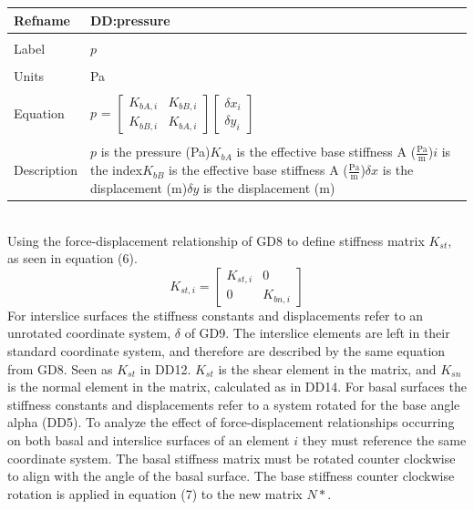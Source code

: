 \documentclass[12pt]{article}
\begin{document}
\noindent \begin{minipage}{\textwidth}
\begin{tabular}{p{} p{}}
\toprule \textbf{Refname} & \textbf{DD:pressure}
\label{DD:pressure}
\\ \midrule \\
Label & $p$
\\ \midrule \\
Units & Pa
\\ \midrule \\
Equation & $p$ = $\begin{bmatrix}
K_{bA,i} & K_{bB,i}\\
K_{bB,i} & K_{bA,i}
\end{bmatrix}\begin{bmatrix}
{\delta{}x}_{i}\\
{\delta{}y}_{i}
\end{bmatrix}$
\\ \midrule \\
Description & $p$ is the pressure (Pa)\newline$K_{bA}$ is the effective base stiffness A ($\frac{\text{Pa}}{\text{m}}$)\newline$i$ is the index\newline$K_{bB}$ is the effective base stiffness A ($\frac{\text{Pa}}{\text{m}}$)\newline$\delta{}x$ is the displacement (m)\newline$\delta{}y$ is the displacement (m)
\\ \bottomrule \end{tabular}
\end{minipage}\\
Using the force-displacement relationship of GD8 to define stiffness matrix $K_{st}$, as seen in equation (6).
\begin{equation}
K_{st,i}=\begin{bmatrix}
K_{st,i} & 0\\
0 & K_{bn,i}
\end{bmatrix}
\end{equation}
For interslice surfaces the stiffness constants and displacements refer to an unrotated coordinate system, $\delta{}$ of GD9. The interslice elements are left in their standard coordinate system, and therefore are described by the same equation from GD8. Seen as $K_{st}$ in DD12. $K_{st}$ is the shear element in the matrix, and $K_{sn}$ is the normal element in the matrix, calculated as in DD14.
For basal surfaces the stiffness constants and displacements refer to a system rotated for the base angle alpha (DD5). To analyze the effect of force-displacement relationships occurring on both basal and interslice surfaces of an element $i$ they must reference the same coordinate system. The basal stiffness matrix must be rotated counter clockwise to align with the angle of the basal surface. The base stiffness counter clockwise rotation is applied in equation (7) to the new matrix $N*$.
\end{document}

